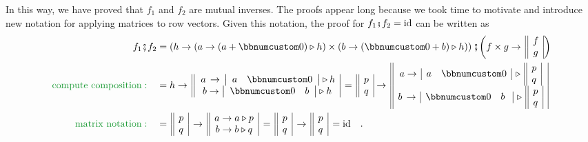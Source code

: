 In this way, we have proved that $f_{1}$ and $f_{2}$ are mutual
inverses. The proofs appear long because we took time to motivate
and introduce new notation for applying matrices to row vectors. Given
this notation, the proof for $f_{1}\bef f_{2}=\text{id}$ can be written
as
\begin{align*}
f_{1}\bef f_{2} & =\left(h\rightarrow(a\rightarrow(a+\bbnum 0)\triangleright h)\times(b\rightarrow(\bbnum 0+b)\triangleright h)\right)\bef\bigg(f\times g\rightarrow\,\begin{array}{||c|}
f\\
g
\end{array}\bigg)\\
{\color{greenunder}\text{compute composition}:}\quad & =h\rightarrow\,\begin{array}{||c|}
\,a\,\rightarrow\,\left|\begin{array}{cc}
a & \bbnum 0\end{array}\right|\triangleright h\\
b\rightarrow\left|\begin{array}{cc}
\bbnum 0 & b\end{array}\right|\triangleright h
\end{array}\,=\,\begin{array}{||c|}
p\\
q
\end{array}\rightarrow\,\begin{array}{||c|}
a\rightarrow\,\begin{array}{|cc|}
a & \bbnum 0\end{array}\,\triangleright\,\begin{array}{||c|}
p\\
q
\end{array}\\
b\,\rightarrow\,\begin{array}{|cc|}
\bbnum 0 & b\,\,\end{array}\,\triangleright\,\begin{array}{||c|}
p\\
q
\end{array}
\end{array}\\
{\color{greenunder}\text{matrix notation}:}\quad & =\,\begin{array}{||c|}
p\\
q
\end{array}\,\rightarrow\,\begin{array}{||c|}
a\rightarrow a\triangleright p\\
b\rightarrow b\triangleright q
\end{array}\,=\,\begin{array}{||c|}
p\\
q
\end{array}\,\rightarrow\,\begin{array}{||c|}
p\\
q
\end{array}\,=\text{id}\quad.
\end{align*}
